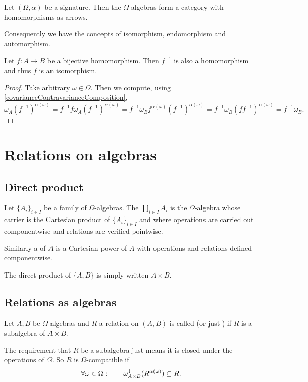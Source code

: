 \begin{proposition}
Let $(\Omega,\alpha)$ be a signature. Then the $\Omega$-algebras form a category with homomorphisms as arrows.
\end{proposition}
Consequently we have the concepts of isomorphism, endomorphism and automorphism.

\begin{proposition} \label{bijectiveHomomorphism}
Let $f:A\to B$ be a bijective homomorphism. Then $f^{-1}$ is also a homomorphism and thus $f$ is an isomorphism.
\end{proposition}
\begin{proof}
Take arbitrary $\omega\in\Omega$. Then we compute, using \ref{covarianceContravarianceComposition},
\[ \omega_A (f^{-1})^{\alpha(\omega)} = f^{-1} f\omega_A (f^{-1})^{\alpha(\omega)} = f^{-1}\omega_B f^{\alpha(\omega)} (f^{-1})^{\alpha(\omega)} = f^{-1}\omega_B (f f^{-1})^{\alpha(\omega)} = f^{-1}\omega_B. \]
\end{proof}

\section{Relations on algebras}
\subsection{Direct product}
\begin{definition}
Let $\{A_i\}_{i\in I}$ be a family of $\Omega$-algebras. The  $\prod_{i\in I} A_i$ is the $\Omega$-algebra whose carrier is the Cartesian product of $\{A_i\}_{i\in I}$ and where operations are carried out componentwise and relations are verified pointwise.

Similarly a  of $A$ is a Cartesian power of $A$ with operations and relations defined componentwise.
\end{definition}

The direct product of $\{A,B\}$ is simply written $A\times B$.

\subsection{Relations as algebras}
\begin{definition}
Let $A,B$ be $\Omega$-algebras and $R$ a relation on $(A,B)$ is called  (or just ) if $R$ is a subalgebra of $A\times B$.
\end{definition}
The requirement that $R$ be a subalgebra just means it is closed under the operations of $\Omega$. So $R$ is $\Omega$-compatible if
\[ \forall \omega\in\Omega: \qquad \omega_{A\times B}^\downarrow(R^{\alpha(\omega)}) \subseteq R. \]

